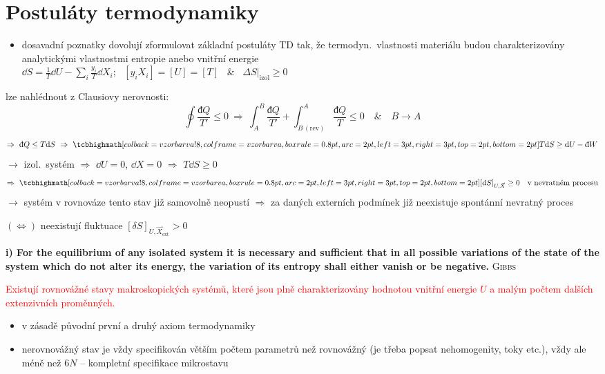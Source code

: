 \section{Postuláty termodynamiky}
\providecommand{\dbar}{\text{đ}}

\begin{itemize}
  \item dosavadní poznatky dovolují zformulovat základní postuláty TD tak, že termodyn.\ vlastnosti materiálu budou charakterizovány analytickými vlastnostmi entropie anebo vnitřní energie \\
  \textcolor{NavyBlue}{$\dd S = \frac1T\dd U - \sum_i\frac{y_i}{T}\dd X_i$; \ $[y_iX_i] = [U] = [T]$ \ \& \ $\Delta S|_{\text{izol}}\geq 0$}
\end{itemize}

lze nahlédnout z Clausiovy nerovnosti:
\[
  \oint\frac{\dbar Q}{T'}\leq 0 \ \Rightarrow\ \int_A^B\frac{\dbar Q}{T'} + \int_{B\,(\text{rev})}^A\frac{\dbar Q}{T}\leq 0 \quad\&\quad B\to A
\]
\[
  \Rightarrow\ \dbar Q\leq T\dd S \ \Rightarrow\ \vzorec{T\dd S\geq\dd U - \dbar W}
\]
$\to$ izol.\ systém $\Rightarrow$ $\dd U = 0$, $\dd X = 0$ $\Rightarrow$ $T\dd S\geq 0$
\[
  \Rightarrow\ \vzorec{[\dd S]_{U,\vec X}\geq 0 \quad\text{v nevratném procesu}}
\]
$\to$ systém v rovnováze tento stav již samovolně neopustí $\Rightarrow$ za daných externích podmínek již neexistuje spontánní nevratný proces

\begin{veta}
$(\Leftrightarrow)$ neexistují fluktuace \quad $[\delta S]_{U,\vec X_{\text{ext}}} > 0$

\medskip
\textbf{\sffamily\small i) For the equilibrium of any isolated system it is necessary and sufficient that in all possible variations of the state of the system which do not alter its energy, the variation of its entropy shall either vanish or be negative.} \hfill \textsc{Gibbs}
\end{veta}
\begin{veta}[Postulát 1]
\textcolor{Red}{Existují rovnovážné stavy makroskopických systémů, které jsou plně charakterizovány hodnotou vnitřní energie $U$ a malým počtem dalších extenzivních proměnných.}
\end{veta}
\begin{itemize}
  \item[$\to$] v zásadě původní první a druhý axiom termodynamiky
  \item[$\to$] nerovnovážný stav je vždy specifikován větším počtem parametrů než rovnovážný (je třeba popsat nehomogenity, toky etc.), vždy ale méně než $6N$ -- kompletní specifikace mikrostavu
\end{itemize}

